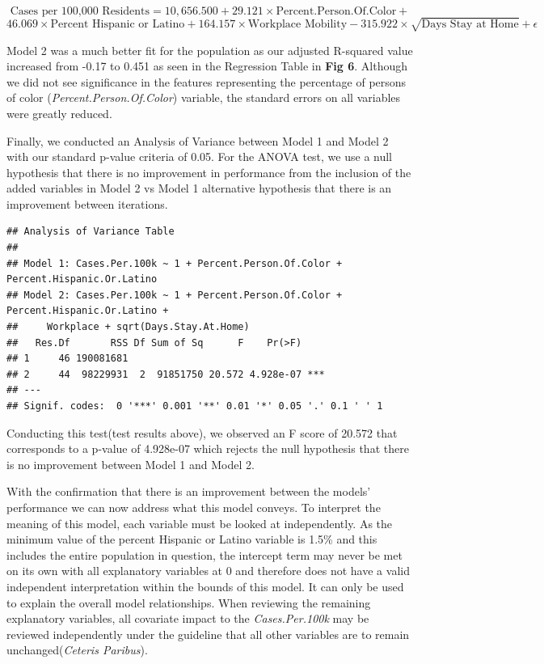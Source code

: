 \documentclass[
]{article}
\begin{document}
\[ \text{Cases per 100,000 Residents} = 10,656.500 + 29.121 \times \text{Percent.Person.Of.Color} + \]
\[46.069 \times \text{Percent Hispanic or Latino} +  164.157 \times \text{Workplace Mobility} -315.922 \times \sqrt{ \text{Days Stay at Home}} + \epsilon\]

Model 2 was a much better fit for the population as our adjusted
R-squared value increased from -0.17 to 0.451 as seen in the Regression
Table in \textbf{Fig 6}. Although we did not see significance in the
features representing the percentage of persons of color
(\emph{Percent.Person.Of.Color}) variable, the standard errors on all
variables were greatly reduced.

Finally, we conducted an Analysis of Variance between Model 1 and Model
2 with our standard p-value criteria of 0.05. For the ANOVA test, we use
a null hypothesis that there is no improvement in performance from the
inclusion of the added variables in Model 2 vs Model 1 alternative
hypothesis that there is an improvement between iterations.

\begin{verbatim}
## Analysis of Variance Table
## 
## Model 1: Cases.Per.100k ~ 1 + Percent.Person.Of.Color + Percent.Hispanic.Or.Latino
## Model 2: Cases.Per.100k ~ 1 + Percent.Person.Of.Color + Percent.Hispanic.Or.Latino + 
##     Workplace + sqrt(Days.Stay.At.Home)
##   Res.Df       RSS Df Sum of Sq      F    Pr(>F)    
## 1     46 190081681                                  
## 2     44  98229931  2  91851750 20.572 4.928e-07 ***
## ---
## Signif. codes:  0 '***' 0.001 '**' 0.01 '*' 0.05 '.' 0.1 ' ' 1
\end{verbatim}

Conducting this test(test results above), we observed an F score of
20.572 that corresponds to a p-value of 4.928e-07 which rejects the null
hypothesis that there is no improvement between Model 1 and Model 2.

With the confirmation that there is an improvement between the models'
performance we can now address what this model conveys. To interpret the
meaning of this model, each variable must be looked at independently. As
the minimum value of the percent Hispanic or Latino variable is 1.5\%
and this includes the entire population in question, the intercept term
may never be met on its own with all explanatory variables at 0 and
therefore does not have a valid independent interpretation within the
bounds of this model. It can only be used to explain the overall model
relationships. When reviewing the remaining explanatory variables, all
covariate impact to the \emph{Cases.Per.100k} may be reviewed
independently under the guideline that all other variables are to remain
unchanged(\emph{Ceteris Paribus}).
\end{document}
